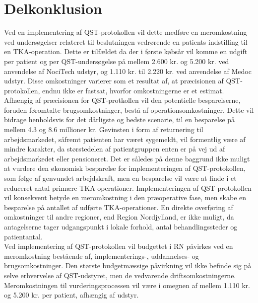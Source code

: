 \section{Delkonklusion}
Ved en implementering af QST-protokollen vil dette medføre en meromkostning ved  undersøgelser relateret til beslutningen vedrørende en patients indstilling til en TKA-operation. Dette er tilfældet da der i første købsår vil komme en udgift per patient og per QST-undersøgelse på mellem 2.600 kr. og 5.200 kr. ved anvendelse af NociTech udstyr, og 1.110 kr. til 2.220 kr. ved anvendelse af Medoc udstyr. Disse omkostninger varierer som et resultat af, at præcisionen af QST-protokollen, endnu ikke er fastsat, hvorfor omkostningerne er et estimat. Afhængig af præcisionen for QST-protkollen vil den potentielle besparelserne, foruden føromtalte brugsomkostninger, bestå af operationsomkostninger. Dette vil bidrage henholdsvis for det dårligste og bedste scenarie, til en besparelse på mellem 4.3 og 8.6 millioner kr. Gevinsten i form af returnering til arbejdsmarkedet, såfremt patienten har været sygemeldt, vil formentlig være af mindre karakter, da størstedelen af patientgruppen enten er på vej ud af arbejdsmarkedet eller pensioneret. Det er således på denne baggrund ikke muligt at vurdere den økonomisk besparelse for implementeringen af QST-protokollen, som følge af genvundet arbejdskraft, men en besparelse vil være at finde i et reduceret antal primære TKA-operationer. Implementeringen af QST-protokollen vil konsekvent betyde en meromkostning i den præoperative fase, men skabe en besparelse på antallet af udførte TKA-operationer. En direkte overføring af omkostninger til andre regioner, end Region Nordjylland, er ikke muligt, da antagelserne tager udgangspunkt i lokale forhold, antal behandlingssteder og patientantal. \\
Ved implementering af QST-protokollen vil budgettet i RN påvirkes ved en meromkostning bestående af, implementerings-, uddannelses- og brugsomkostninger. Den største budgetmæssige påvirkning vil ikke befinde sig på selve erhvervelse af QST-udstyret, men de vedvarende driftsomkostningerne. Meromkostningen til vurderingsprocessen vil være i omegnen af mellem 1.110 kr. og 5.200 kr. per patient, afhængig af udstyr.  